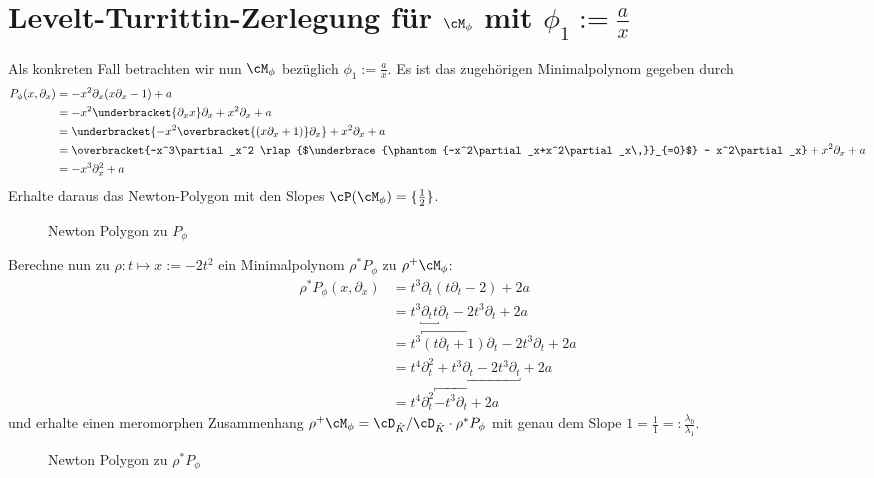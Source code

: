 \section{Levelt-Turrittin-Zerlegung für $\cM_{\phi}$ mit
  $\phi_1:=\frac{a}{x}$}
\begin{comment}
rechtfertigen, das mehr gerechnet wird, als nötig
\end{comment}
Als konkreten Fall betrachten wir nun $\cM_{\phi}$ bezüglich
$\phi_1:=\frac{a}{x}$. 
Es ist das zugehörigen Minimalpolynom gegeben durch
\begin{align*}
P_{\phi}(x,\partial_x) &=-x^2\partial_x (x\partial_x-1)+a
\\&=-x^2\underbracket{\partial_xx}\partial_x+x^2\partial_x+a
\\&=\underbracket{-x^2\overbracket{(x\partial_x+1)}\partial_x} + x^2\partial_x
  + a
\\&=\overbracket{-x^3\partial_x^2
  \rlap{$\underbrace{\phantom{-x^2\partial_x+x^2\partial_x\,}}_{=0}$}
  - x^2\partial_x}+x^2\partial_x+a
\\&=-x^3\partial_x^2+a
\end{align*}
Erhalte daraus das Newton-Polygon mit den Slopes
$\cP(\cM_{\phi})=\{\frac{1}{2}\}$.
\begin{figure}[H] %
\begin{center}
\end{center}
\caption{Newton Polygon zu $P_{\phi}$}
\end{figure}
Berechne nun zu $\rho:t\mapsto x:=-2t^2$ ein Minimalpolynom $\rho^*P_{\phi}$
zu $\rho^+\cM_{\phi}$:
\begin{align*}
\rho^*P_{\phi}(x,\partial_x)
  &=t^{3}\partial_t(t\partial_t-2)+2a\\
  &=t^{3}\underbracket{\partial_tt}\partial_t-2t^{3}\partial_t+2a\\
  &=t^{3}\overbracket{(t\partial_t+1)}\partial_t-2t^{3}\partial_t+2a\\
  &=t^{4}\partial_t^2+\underbracket{t^{3}\partial_t-2t^{3}\partial_t}+2a\\
  &=t^{4}\partial_t^2\overbracket{-t^{3}\partial_t}+2a
\end{align*}
und erhalte einen meromorphen Zusammenhang $\rho^+\cM_{\phi}=\cD_{\hat
K}/\cD_{\hat K}\cdot\rho^*P_{\phi}$ mit genau dem Slope
$1=\frac{1}{1}=:\frac{\lambda_0}{\lambda_1}$.
\begin{figure}[H]
\begin{center}
\end{center}
\caption{Newton Polygon zu $\rho^*P_{\phi}$}
\end{figure}

